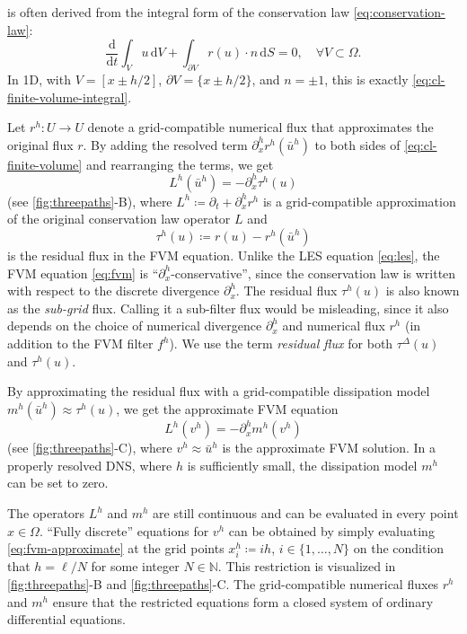 \documentclass[preprint,twocolumn,5p]{elsarticle}
\begin{document}
 is often derived from the integral form of
the conservation law \eqref{eq:conservation-law}:
\begin{equation}
    \frac{\mathrm{d}}{\mathrm{d} t} \int_V u \, \mathrm{d} V
    + \int_{\partial V} r(u) \cdot n \, \mathrm{d} S = 0,
    \quad \forall V \subset \Omega.
\end{equation}
In 1D, with
$V = [x \pm h / 2]$,
$\partial V = \{ x \pm h / 2 \}$, and
$n = \pm 1$,
this is exactly \cref{eq:cl-finite-volume-integral}.

Let $r^h : U \to U$ denote a grid-compatible numerical flux that approximates
the original flux $r$.
By adding the resolved term $\partial^h_x r^h(\bar{u}^h)$ to both sides of
\cref{eq:cl-finite-volume} and rearranging the terms, we get
\begin{equation} \label{eq:fvm}
    L^h(\bar{u}^h) = - \partial^h_x \tau^h(u)
\end{equation}
(see \cref{fig:threepaths}-B), where
$L^h \coloneq \partial_t + \partial^h_x r^h$ is a grid-compatible approximation
of the original conservation law operator $L$ and
\begin{equation} \label{eq:cl-tauh}
    \boxed{\tau^h(u) \coloneq r(u) - r^h(\bar{u}^h)}
\end{equation}
is the residual flux in the FVM equation.
Unlike the LES equation \eqref{eq:les}, the FVM equation \eqref{eq:fvm}
is ``$\partial^h_x$-conservative'', since the conservation law is 
written with respect to the discrete divergence $\partial^h_x$.
The residual flux $\tau^h(u)$ is also known as the \emph{sub-grid} flux.
Calling it a sub-filter flux would be misleading, since
it also depends on the choice of 
numerical divergence $\partial^h_x$ and
numerical flux $r^h$
(in addition to the FVM filter $f^h$).
We use the term \emph{residual flux} for both $\tau^\Delta(u)$ and $\tau^h(u)$.

By approximating the residual flux with a grid-compatible dissipation model
$m^h(\bar{u}^h) \approx \tau^h(u)$, we get the approximate FVM equation
\begin{equation} \label{eq:fvm-approximate}
    L^h(v^h) = -\partial^h_x m^h(v^h)
\end{equation}
(see \cref{fig:threepaths}-C),
where $v^h \approx \bar{u}^h$ is the approximate FVM solution.
In a properly resolved DNS, where $h$ is sufficiently small,
the dissipation model $m^h$ can be set to zero.




The operators $L^h$ and $m^h$ are still continuous and can be evaluated in
every point $x \in \Omega$.
``Fully discrete''
equations for $v^h$ can be
obtained by simply evaluating \cref{eq:fvm-approximate} at the grid points
$x^h_i \coloneq i h$, $i \in \{ 1, \dots, N \}$ on the condition that $h = \ell /
N$ for some integer $N \in \mathbb{N}$.
This restriction is visualized in \cref{fig:threepaths}-B and \cref{fig:threepaths}-C.
The grid-compatible numerical fluxes $r^h$ and $m^h$ ensure that the
restricted equations form a closed system of ordinary differential equations.
\end{document}
